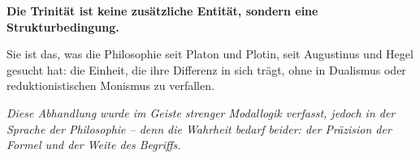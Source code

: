 \documentclass[
]{article}
\begin{document}
\textbf{Die Trinität ist keine zusätzliche Entität, sondern eine Strukturbedingung.}

Sie ist das, was die Philosophie seit Platon und Plotin, seit Augustinus und Hegel gesucht hat: die Einheit, die ihre Differenz in sich trägt, ohne in Dualismus oder reduktionistischen Monismus zu verfallen.

\begin{center}
\emph{Diese Abhandlung wurde im Geiste strenger Modallogik verfasst, jedoch in der Sprache der Philosophie – denn die Wahrheit bedarf beider: der Präzision der Formel und der Weite des Begriffs.}
\end{center}
\end{document}
